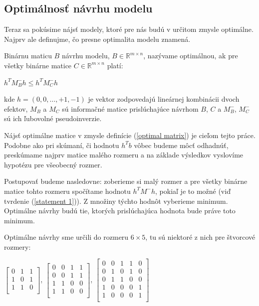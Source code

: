 \subsection{Optimálnosť návrhu modelu}

Teraz sa pokúsime nájsť modely, ktoré pre nás budú v určitom zmysle optimálne. 
Najprv ale definujme, čo presne optimalita modelu znamená.

\begin{defin}
\label{optimal matrix definition}
Binárnu maticu $B$ návrhu modelu, $B \in \mathbb{R}^{m \times n}$, nazývame optimálnou, 
ak pre všetky binárne matice $C \in \mathbb{R}^{m \times n}$ platí:

\begin{center}
\label{optimal matrix}
$h^T M_{B}^- h \leq h^T M_{C}^- h$
\end{center}
kde $h = (0, 0,\ldots , +1, -1)$ je vektor zodpovedajú lineárnej kombinácii dvoch efektov, 
$M_B$ a $M_C$ sú informačné matice prislúchajúce návrhom $B$, $C$ a $M_{B}^-$, $M_{C}^-$ sú ich ľubovolné pseudoinverzie.

\end{defin}

Nájsť optimálne matice v zmysle definície (\ref{optimal matrix}) je cieľom tejto práce. 
Podobne ako pri skúmaní, či hodnotu $h^T b$ vôbec budeme môcť odhadnúť, 
preskúmame najprv matice malého rozmeru a na základe výsledkov vyslovíme hypotézu pre všeobecný rozmer.

Postupovať budeme nasledovne: zoberieme si malý rozmer a pre všetky binárne matice tohto rozmeru spočítame hodnotu $h^T M^- h$, 
pokiaľ je to možné (viď tvrdenie (\ref{statement 1})). Z množiny týchto hodnôt vyberieme minimum. 
Optimálne návrhy budú tie, ktorých prislúchajúca hodnota bude práve toto minimum.

Optimálne návrhy sme určili do rozmeru $6 \times 5$, tu sú niektoré z nich pre štvorcové rozmery:

\begin{center}
$
\begin{bmatrix}
0 & 1 & 1 \\ 
1 & 0 & 1 \\ 
1 & 1 & 0 \\ 
\end{bmatrix}
$, 
$
\begin{bmatrix}
0 & 0 & 1 & 1 \\
0 & 0 & 1 & 1 \\
1 & 1 & 0 & 0 \\
1 & 1 & 0 & 0 \\
\end{bmatrix}
$, 
$
\begin{bmatrix}
0 & 0 & 1 & 1 & 0 \\
0 & 1 & 0 & 1 & 0 \\
0 & 1 & 1 & 0 & 0 \\
1 & 0 & 0 & 0 & 1 \\
1 & 0 & 0 & 0 & 1 \\
\end{bmatrix}
$
\end{center}


